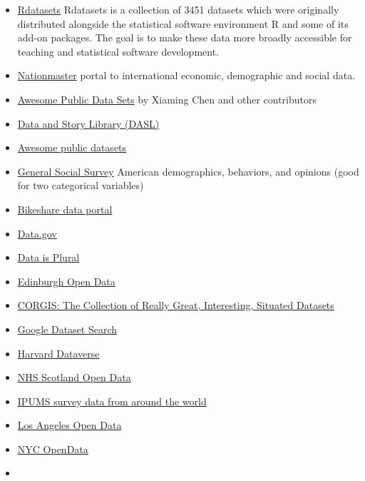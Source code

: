 \documentclass[
  letterpaper,
  DIV=11,
  numbers=noendperiod]{scrartcl}
\providecommand{\tightlist}{%
  \setlength{\itemsep}{0pt}\setlength{\parskip}{0pt}}\usepackage{longtable,booktabs,array}
\begin{document}
\begin{itemize}
\tightlist
\item
  \href{https://vincentarelbundock.github.io/Rdatasets/}{Rdatasets}
  Rdatasets is a collection of 3451 datasets which were originally
  distributed alongside the statistical software environment R and some
  of its add-on packages. The goal is to make these data more broadly
  accessible for teaching and statistical software development.
\item
  \href{http://www.nationmaster.com/}{Nationmaster} portal to
  international economic, demographic and social data.
\item
  \href{https://github.com/caesar0301/awesome-public-datasets}{Awesome
  Public Data Sets} by Xiaming Chen and other contributors
\item
  \href{http://dasl.datadesk.com/}{Data and Story Library (DASL)}
\item
  \href{https://github.com/awesomedata/awesome-public-datasets}{Awesome
  public datasets}
\item
  \href{https://gss.norc.org/us/en/gss/get-the-data.html}{General Social
  Survey} American demographics, behaviors, and opinions (good for two
  categorical variables)
\item
  \href{https://www.bikeshare.com/data/}{Bikeshare data portal}
\item
  \href{https://www.data.gov/}{Data.gov}
\item
  \href{https://docs.google.com/spreadsheets/d/1wZhPLMCHKJvwOkP4juclhjFgqIY8fQFMemwKL2c64vk/edit\#gid=0}{Data
  is Plural}
\item
  \href{https://edinburghopendata.info/}{Edinburgh Open Data}
\item
  \href{https://corgis-edu.github.io/corgis/}{CORGIS: The Collection of
  Really Great, Interesting, Situated Datasets}
\item
  \href{https://datasetsearch.research.google.com/}{Google Dataset
  Search}
\item
  \href{https://dataverse.harvard.edu/}{Harvard Dataverse}
\item
  \href{https://www.opendata.nhs.scot/}{NHS Scotland Open Data}
\item
  \href{https://ipums.org/}{IPUMS survey data from around the world}
\item
  \href{https://data.lacity.org/browse}{Los Angeles Open Data}
\item
  \href{https://opendata.cityofnewyork.us/}{NYC OpenData}
\item

\end{itemize}
\end{document}
